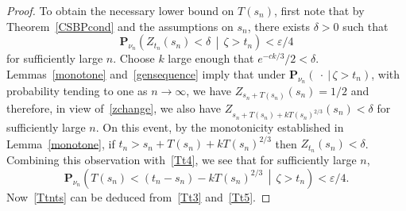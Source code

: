 \documentclass[AHL,Unicode,longabstracts,published]{cedram}
\newcommand*\eps{\varepsilon}
\renewcommand*\P{\mathbf{P}}
\newcommand{\1} {\mathds{1}}
\begin{document}
\begin{proof}
To obtain the necessary lower bound on $T(s_n)$, first note that by Theorem~\ref{CSBPcond} and the assumptions on $s_n$, there exists $\delta > 0$ such that
\begin{equation}\label{Tt4}
\P_{\nu_n}\left(Z_{t_n}(s_n) < \delta\,\middle|\,\zeta > t_n\right) < \eps/4
\end{equation}
for sufficiently large $n$. Choose $k$ large enough that $e^{-ck/3}/2 < \delta$. Lemmas~\ref{monotone} and~\ref{gensequence} imply that under $\P_{\nu_n}(\: \cdot \: |\, \zeta > t_n)$, with probability tending to one as $n \rightarrow \infty$, we have $Z_{s_n + T(s_n)}(s_n) = 1/2$ and therefore, in view of~\eqref{zchange}, we also have $Z_{s_n + T(s_n) + kT(s_n)^{2/3}}(s_n) < \delta$ for sufficiently large $n$. On this event, by the monotonicity established in Lemma~\ref{monotone}, if $t_n > s_n + T(s_n) + kT(s_n)^{2/3}$ then $Z_{t_n}(s_n) < \delta$. Combining this observation with~\eqref{Tt4}, we see that for sufficiently large $n$,
\begin{equation}\label{Tt5}
\P_{\nu_n}\left(T(s_n) < (t_n - s_n) - kT(s_n)^{2/3} \,\middle|\, \zeta > t_n\right) < \eps/4.
\end{equation}
Now~\eqref{Ttnts} can be deduced from~\eqref{Tt3} and~\eqref{Tt5}.
\end{proof}
\end{document}

